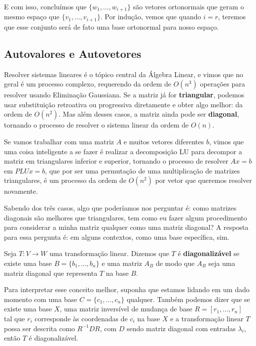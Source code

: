 \documentclass[11pt, a4paper]{article}
\begin{document}
E com isso, concluímos que \(\{w_1,...,w_{i+1}\}\) são vetores ortonormais que geram o mesmo espaço que \(\{v_1,...,v_{i+1}\}\). Por indução, vemos que quando \(i=r\), teremos que esse conjunto será de fato uma base ortonormal para nosso espaço.

\subsection{Autovalores e Autovetores}

Resolver sistemas lineares é o tópico central da Álgebra Linear, e vimos que no geral é um processo complexo, requerendo da ordem de \(O(n^3)\) operações para resolver usando Eliminação Gaussiana. Se a matriz já for \textbf{triangular}, podemos usar substituição retroativa ou progressiva diretamente e obter algo melhor: da ordem de \(O(n^2)\). Mas além desses casos, a matriz ainda pode ser \textbf{diagonal}, tornando o processo de resolver o sistema linear da ordem de \(O(n)\).

Se vamos trabalhar com uma matriz \(A\) e muitos vetores diferentes \(b\), vimos que uma coisa inteligente a se fazer é realizar a decomposição LU para decompor a matriz em triangulares inferior e superior, tornando o processo de resolver \(Ax=b\) em \(PLUx=b\), que por ser uma permutação de uma multiplicação de matrizes triangulares, é um processo da ordem de \(O(n^2)\) por vetor que queremos resolver novamente.

Sabendo dos três casos, algo que poderíamos nos perguntar é: como matrizes diagonais são melhores que triangulares, tem como eu fazer algum procedimento para considerar a minha matriz qualquer como uma matriz diagonal? A resposta para essa pergunta é: em alguns contextos, como uma base específica, sim.

Seja \(T:V\rightarrow W\) uma transformação linear. Dizemos que \(T\) é \textbf{diagonalizável} se existe uma base \(B=\{b_1,...,b_n\}\) e uma matriz \(A_B\) de modo que \(A_B\) seja uma matriz diagonal que representa \(T\) na base \(B\).

Para interpretar esse conceito melhor, suponha que estamos lidando em um dado momento com uma base \(C=\{c_1,...,c_n\}\) qualquer. Também podemos dizer que se existe uma base \(X\), uma matriz inversível de mudança de base \(R=[r_1,...,r_n]\) tal que \(r_i\) corresponde às coordenadas de \(c_i\) na base \(X\) e a transformação linear \(T\) possa ser descrita como \(R^{-1}DR\), com \(D\) sendo matriz diagonal com entradas \(\lambda_i\), então \(T\) é diagonalizável.
\end{document}
